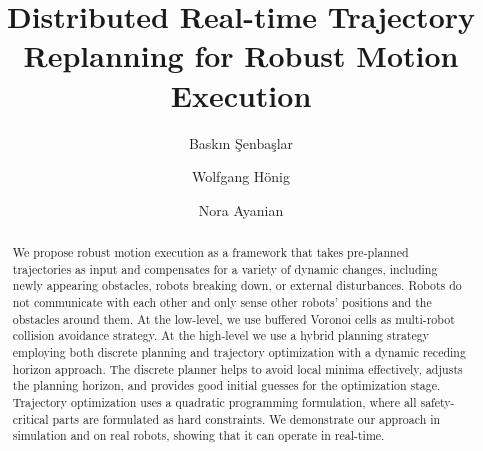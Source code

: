 \documentclass{svproc}
\begin{document}
\mainmatter              %
%
% 
\title{Distributed Real-time Trajectory Replanning for Robust Motion Execution}%


%
%
\author{Baskın Şenbaşlar \and Wolfgang H\"onig \and
Nora Ayanian}
%
%
%

\maketitle              %

\begin{abstract}
We propose robust motion execution as a framework that takes pre-planned trajectories as input and compensates for a variety of dynamic changes, including newly appearing obstacles, robots breaking down, or external disturbances.
Robots do not communicate with each other and only sense other robots' positions and the obstacles around them.
At the low-level, we use buffered Voronoi cells as multi-robot collision avoidance strategy.
At the high-level we use a hybrid planning strategy employing both discrete planning and trajectory optimization with a dynamic receding horizon approach.
The discrete planner helps to avoid local minima effectively, adjusts the planning horizon, and provides good initial guesses for the optimization stage.
Trajectory optimization uses a quadratic programming formulation, where all safety-critical parts are formulated as hard constraints.
We demonstrate our approach in simulation and on real robots, showing that it can operate in real-time.
\end{abstract}
\end{document}
